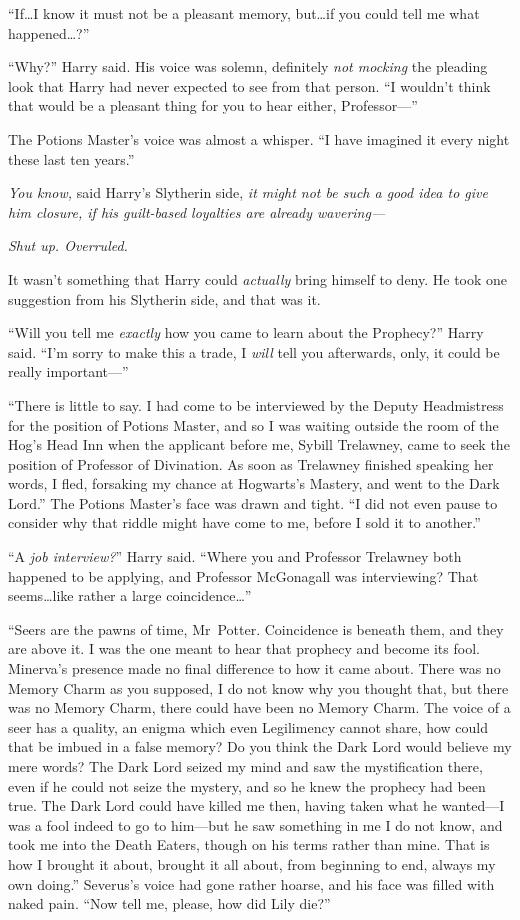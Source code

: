 “If…I know it must not be a pleasant memory, but…if you could tell me what happened…?”

“Why?” Harry said. His voice was solemn, definitely \emph{not mocking} the pleading look that Harry had never expected to see from that person. “I wouldn’t think that would be a pleasant thing for you to hear either, Professor—”

The Potions Master’s voice was almost a whisper. “I have imagined it every night these last ten years.”

\emph{You know,} said Harry’s Slytherin side, \emph{it might not be such a good idea to give him closure, if his guilt-based loyalties are already wavering—}

\emph{Shut up. Overruled.}

It wasn’t something that Harry could \emph{actually} bring himself to deny. He took one suggestion from his Slytherin side, and that was it.

“Will you tell me \emph{exactly} how you came to learn about the Prophecy?” Harry said. “I’m sorry to make this a trade, I \emph{will} tell you afterwards, only, it could be really important—”

“There is little to say. I had come to be interviewed by the Deputy Headmistress for the position of Potions Master, and so I was waiting outside the room of the Hog’s Head Inn when the applicant before me, Sybill Trelawney, came to seek the position of Professor of Divination. As soon as Trelawney finished speaking her words, I fled, forsaking my chance at Hogwarts’s Mastery, and went to the Dark Lord.” The Potions Master’s face was drawn and tight. “I did not even pause to consider why that riddle might have come to me, before I sold it to another.”

“A \emph{job interview?}” Harry said. “Where you and Professor Trelawney both happened to be applying, and Professor McGonagall was interviewing? That seems…like rather a large coincidence…”

“Seers are the pawns of time, Mr~Potter. Coincidence is beneath them, and they are above it. I was the one meant to hear that prophecy and become its fool. Minerva’s presence made no final difference to how it came about. There was no Memory Charm as you supposed, I do not know why you thought that, but there was no Memory Charm, there could have been no Memory Charm. The voice of a seer has a quality, an enigma which even Legilimency cannot share, how could that be imbued in a false memory? Do you think the Dark Lord would believe my mere words? The Dark Lord seized my mind and saw the mystification there, even if he could not seize the mystery, and so he knew the prophecy had been true. The Dark Lord could have killed me then, having taken what he wanted—I was a fool indeed to go to him—but he saw something in me I do not know, and took me into the Death Eaters, though on his terms rather than mine. That is how I brought it about, brought it all about, from beginning to end, always my own doing.” Severus’s voice had gone rather hoarse, and his face was filled with naked pain. “Now tell me, please, how did Lily die?”

